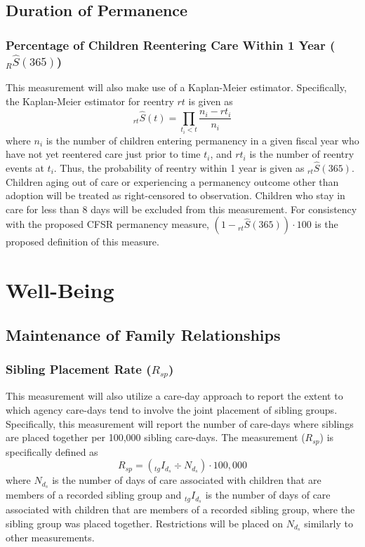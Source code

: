 \documentclass[12pt]{article}\usepackage[]{graphicx}\usepackage[]{color}
\begin{document}
\subsection{Duration of Permanence}

\subsubsection{Percentage of Children Reentering Care Within 1 Year (${}_{R}\hat{S}(365)$)}

This measurement will also make use of a Kaplan-Meier estimator. Specifically, the Kaplan-Meier estimator for reentry $rt$ is given as
\begin{equation}\label{eq:KM3}
{}_{rt}\hat S(t) = \prod\limits_{t_i<t} \frac{n_i-rt_{i}}{n_i}
\end{equation}
where $n_{i}$ is the number of children entering permanency in a given fiscal year who have not yet reentered care just prior to time $t_{i}$, and $rt_{i}$ is the number of reentry events at $t_{i}$. Thus, the probability of reentry within 1 year is given as ${}_{rt}\hat S(365)$. Children aging out of care or experiencing a permanency outcome other than adoption will be treated as right-censored to observation. Children who stay in care for less than 8 days will be excluded from this measurement. For consistency with the proposed CFSR permanency measure, $(1 - {}_{rt}\hat S(365)) \cdot 100$ is the proposed definition of this measure.


\section{Well-Being}

\subsection{Maintenance of Family Relationships}

\subsubsection{Sibling Placement Rate ($R_{sp}$)}

This measurement will also utilize a care-day approach to report the extent to which agency care-days tend to involve the joint placement of sibling groups. Specifically, this measurement will report the number of care-days where siblings are placed together per 100,000 sibling care-days. The measurement ($R_{sp}$) is specifically defined as 
\begin{equation}\label{eq:Rsp}
R_{sp} = ({}_{tg}I_{d_s} \div N_{d_s}) \cdot 100,000
\end{equation}
where $N_d_s$ is the number of days of care associated with children that are members of a recorded sibling group and ${}_{tg}I_d_s$ is the number of days of care associated with children that are members of a recorded sibling group, where the sibling group was placed together. Restrictions will be placed on $N_d_s$ similarly to other measurements. 
\end{document}
